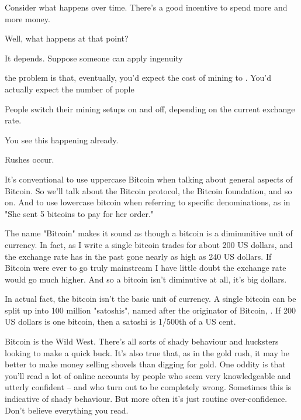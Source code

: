 Consider what happens over time.  There's a good incentive to spend
more and more money.

Well, what happens at that point?  

It depends.  Suppose someone can apply ingenuity 

the problem is that, eventually, you'd expect
the cost of mining to .  You'd actually expect the number of pople

People switch their mining setups on and off, depending on the current
exchange rate.

You see this happening already.  

Rushes occur.


It's conventional to use uppercase Bitcoin when talking about general
aspects of Bitcoin.  So we'll talk about the Bitcoin protocol, the
Bitcoin foundation, and so on.  And to use lowercase bitcoin when
referring to specific denominations, as in "She sent 5 bitcoins to pay
for her order."

The name "Bitcoin" makes it sound as though a bitcoin is a
diminunitive unit of currency.  In fact, as I write a single bitcoin
trades for about 200 US dollars, and the exchange rate has in the past
gone nearly as high as 240 US dollars.  If Bitcoin were ever to go
truly mainstream I have little doubt the exchange rate would go much
higher.  And so a bitcoin isn't diminutive at all, it's big dollars.

In actual fact, the bitcoin isn't the basic unit of currency.  A
single bitcoin can be split up into 100 million "satoshis", named
after the originator of Bitcoin,
.
If 200 US dollars is one bitcoin, then a satoshi is 1/500th of a US
cent.  

Bitcoin is the Wild West.  There's all sorts of shady behaviour and
hucksters looking to make a quick buck.  It's also true that, as in
the gold rush, it may be better to make money selling shovels than
digging for gold.  One oddity is that you'll read a lot of online
accounts by people who seem very knowledgeable and utterly confident
-- and who turn out to be completely wrong.  Sometimes this is
indicative of shady behaviour.  But more often it's just routine
over-confidence.  Don't believe everything you read.

